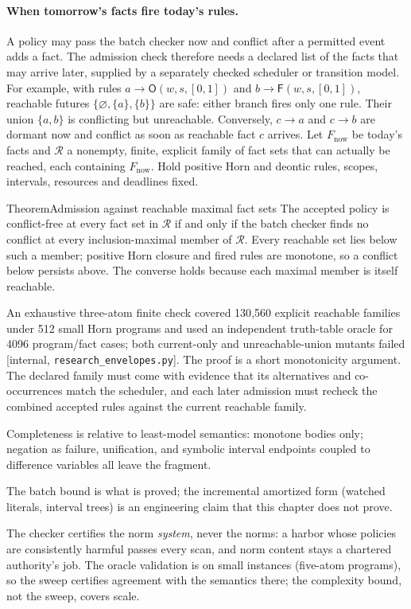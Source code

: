 \documentclass[11pt,a4paper]{article}
\theoremstyle{definition}
\theoremstyle{definition}
\theoremstyle{remark}
\begin{document}
\paragraph{When tomorrow's facts fire today's rules.}\label{sec:he-reachable-admission}
A policy may pass the batch checker now and conflict after a permitted event
adds a fact. The admission check therefore needs a declared list of the facts
that may arrive later, supplied by a separately checked scheduler or
transition model.
For example, with rules $a\to\mathsf O(w,s,[0,1])$ and
$b\to\mathsf F(w,s,[0,1])$, reachable futures
$\{\varnothing,\{a\},\{b\}\}$ are safe: either branch fires only one rule.
Their union $\{a,b\}$ is conflicting but unreachable. Conversely,
$c\to a$ and $c\to b$ are dormant now and conflict as soon as reachable
fact $c$ arrives.
Let $F_{\mathrm{now}}$ be today's facts and $\mathcal R$ a nonempty, finite, explicit family
of fact sets that can actually be reached, each containing $F_{\mathrm{now}}$. Hold positive
Horn and deontic rules, scopes, intervals, resources and deadlines fixed.
\begin{pdclaim}{Theorem}{Admission against reachable maximal fact sets}
\label{thm:he-reachable-admission}
The accepted policy is conflict-free at every fact set in $\mathcal R$ if and
only if the batch checker finds no conflict at every inclusion-maximal member
of $\mathcal R$. Every reachable set lies below such a member; positive Horn
closure and fired rules are monotone, so a conflict below persists above.
The converse holds because each maximal member is itself reachable.
\end{pdclaim}
An exhaustive three-atom finite check covered 130{,}560
explicit reachable families under 512 small Horn programs and used an
independent truth-table oracle for 4096 program/fact cases; both current-only
and unreachable-union mutants failed [internal,
\texttt{research\_envelopes.py}]. The proof is a short monotonicity argument.
The declared family must come with evidence that its alternatives and
co-occurrences match the scheduler, and each later admission must recheck the
combined accepted rules against the current reachable family.

\begin{pdboundary}
\setlength{\parskip}{4pt plus 1pt}
Completeness is relative to least-model semantics: monotone bodies only;
negation as failure, unification, and symbolic interval endpoints coupled to
difference variables all leave the fragment.

The batch bound is what is proved;
the incremental amortized form (watched literals, interval trees) is an
engineering claim that this chapter does not prove.

The checker certifies the norm
\emph{system}, never the norms: a harbor whose policies are consistently harmful
passes every scan, and norm content stays a chartered authority's job. The
oracle validation is on small instances (five-atom programs), so the sweep
certifies agreement with the semantics there; the complexity bound, not the
sweep, covers scale.
\end{pdboundary}
\end{document}
